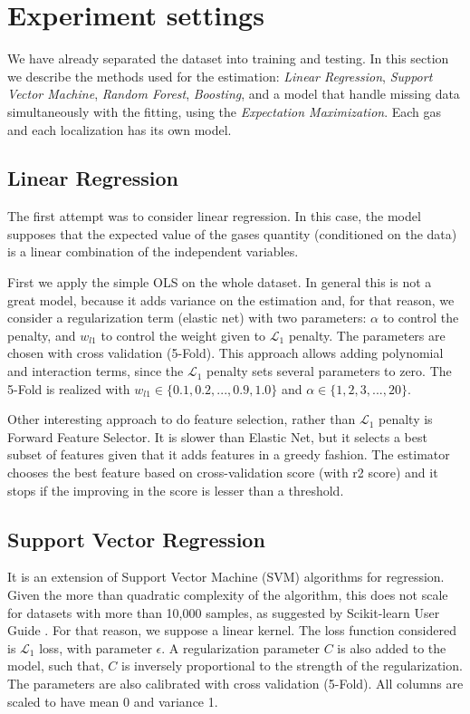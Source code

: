 \section{Experiment settings}
\label{sec:experiments}

We have already separated the dataset into training and testing. In this
section we describe the methods used for the estimation: {\em Linear
Regression}, {\em Support Vector Machine}, {\em Random Forest}, {\em
Boosting}, and a model that handle missing data simultaneously with the
fitting, using the {\em Expectation Maximization}. Each gas and each
localization has its own model. 

\subsection{Linear Regression}

The first attempt was to consider linear regression. In this case, the model
supposes that the expected value of the gases quantity (conditioned on the
data) is a linear combination of the independent variables. 

First we apply the simple OLS on the whole dataset. In general this is not a
great model, because it adds variance on the estimation and, for that reason, we consider a regularization term (elastic
net) with two parameters: $\alpha$ to control the penalty, and $w_{l1}$ to
control the weight given to $\mathcal{L}_1$ penalty. The parameters are chosen
with cross validation (5-Fold). This approach allows adding polynomial and
interaction terms, since the $\mathcal{L}_1$ penalty sets several parameters
to zero. The 5-Fold is realized with $w_{l1} \in \{0.1, 0.2, ..., 0.9, 1.0\}$
and $\alpha \in \{1,2,3,...,20\}$. 

Other interesting approach to do feature selection, rather than $\mathcal{L}_1$
penalty is Forward Feature Selector. It is slower than Elastic Net, but it
selects a best subset of features given that it adds     features in a greedy
fashion. The estimator chooses the best feature based on
cross-validation score (with r2 score) and it stops if the improving in the
score is lesser than a threshold. 

\subsection{Support Vector Regression}

It is an extension of Support Vector Machine (SVM) algorithms for
regression. Given the more than quadratic complexity of the algorithm, this
does not scale for datasets with more than 10,000 samples, as suggested by Scikit-learn User Guide \cite{svr-function,
scikit-learn}. For that reason, we
suppose a linear kernel. The loss function considered is $\mathcal{L}_1$ loss,
with parameter $\epsilon$. A regularization parameter $C$ is also added to the
model, such that, $C$ is inversely proportional to the strength of the
regularization. The parameters are also calibrated with cross validation (5-Fold). All
columns are scaled to have mean 0 and variance 1. 

